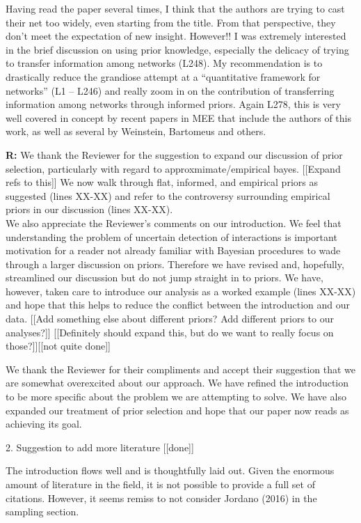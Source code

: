 \documentclass[12pt]{letter}
\newenvironment{refquote}{\bigskip \begin{it}}{\end{it}\smallskip}
\begin{document}
\begin{refquote}
			Having read the paper several times, I think that the authors are trying to cast their net too widely, even starting from the title. From that perspective, they don’t meet the expectation of new insight. However!! I was extremely interested in the brief discussion on using prior knowledge, especially the delicacy of trying to transfer information among networks (L248). My recommendation is to drastically reduce the grandiose attempt at a “quantitative framework for networks” (L1 – L246) and really zoom in on the contribution of transferring information among networks through informed priors.	Again L278, this is very well covered in concept by recent papers in MEE that include the authors of this work, as well as several by Weinstein, Bartomeus and others.
			\end{refquote}


		\textbf{R:} We thank the Reviewer for the suggestion to expand our discussion of prior selection, particularly with regard to approxmimate/empirical bayes. [[Expand refs to this]] We now walk through flat, informed, and empirical priors as suggested (lines XX-XX) and refer to the controversy surrounding empirical priors in our discussion (lines XX-XX).\\
			We also appreciate the Reviewer's comments on our introduction. We feel that understanding the problem of uncertain detection of interactions is important motivation for a reader not already familiar with Bayesian procedures to wade through a larger discussion on priors. Therefore we have revised and, hopefully, streamlined our discussion but do not jump straight in to priors. We have, however, taken care to introduce our analysis as a worked example (lines XX-XX) and hope that this helps to reduce the conflict between the introduction and our data. [[Add something else about different priors? Add different priors to our analyses?]]
			[[Definitely should expand this, but do we want to really focus on those?]][[not quite done]]

			We thank the Reviewer for their compliments and accept their suggestion that we are somewhat overexcited about our approach. We have refined the introduction to be more specific about the problem we are attempting to solve. We have also expanded our treatment of prior selection and hope that our paper now reads as achieving its goal.


	2. Suggestion to add more literature [[done]]

		\begin{refquote}
		The introduction flows well and is thoughtfully laid out. Given the enormous amount of literature in the field, it is not possible to provide a full set of citations. However, it seems remiss to not consider Jordano (2016) in the sampling section.
		\end{refquote}
\end{document}
